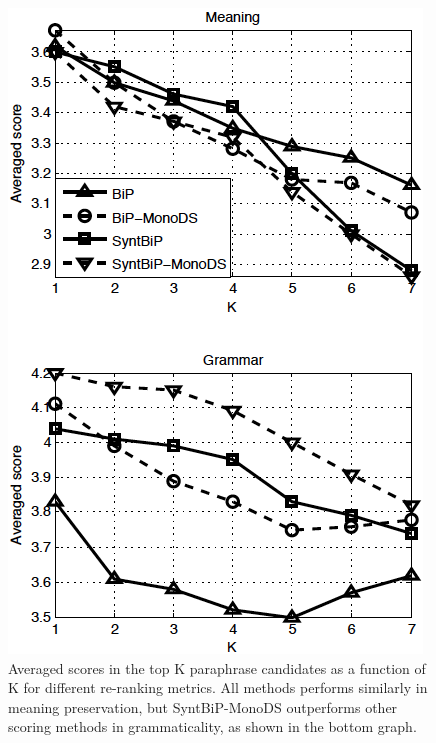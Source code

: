 \documentclass[11pt]{article}
\newcommand{\mnote}[1]{\marginpar{\raggedleft\footnotesize\itshape#1}}
\begin{document}
\begin{figure}
\begin{center}
\includegraphics[width=0.78\linewidth]{meanTopK_vertical_LW2_MS8_2} %
\end{center}
\caption{\small Averaged scores in the top K paraphrase candidates as a function of K for different re-ranking metrics. All methods performs similarly in meaning preservation, but SyntBiP-MonoDS outperforms other scoring methods in grammaticality, as shown in the bottom graph.}
\label{fig_meanTopK}
\end{figure}

\end{document}
